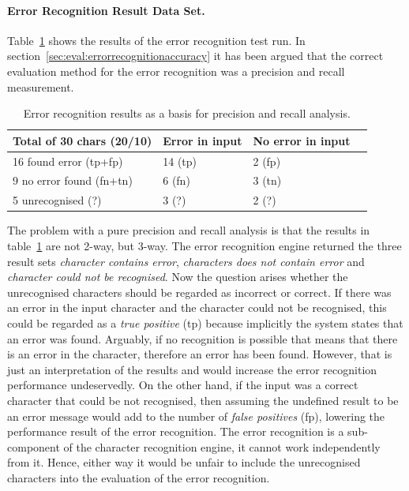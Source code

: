 \paragraph{Error Recognition Result Data Set.}
Table~\ref{table:eval:resultsprecisionandrecallnumbers} shows the results 
of the error recognition test run. 
In section~\ref{sec:eval:errorrecognitionaccuracy} it has been argued that the
correct evaluation method for the error recognition was a precision and recall
measurement.
\begin{table}[htbp]
\begin{center}
  \begin{tabular}{|l|l|l|p{200pt}|}
    \hline
    Total of 30 chars (20/10) & Error in input      & No error in input \\
    \hline
    16 found error (tp+fp)    & 14 (tp)             & 2 (fp) \\
    \hline
    9 no error found (fn+tn)  & 6 (fn)              & 3 (tn) \\
    \hline
    5 unrecognised (?)        & 3 (?)               & 2 (?) \\
    \hline
  \end{tabular}
\end{center}
\caption{Error recognition results as a basis for precision and recall analysis.}
\label{table:eval:resultsprecisionandrecallnumbers}
\end{table}
The problem with a pure precision and recall analysis is that the results
in table~\ref{table:eval:resultsprecisionandrecallnumbers} are not 2-way, 
but 3-way. The error recognition engine returned the three result sets 
\emph{character contains error}, \emph{characters does not contain error}
and \emph{character could not be recognised}.
Now the question arises whether the unrecognised characters should be 
regarded as incorrect or correct. 
If there was an error in the input character and the character could 
not be recognised, this could be regarded as a \emph{true positive} (tp)
because implicitly the system states that an error was found.
Arguably, if no recognition is possible that means that there is an 
error in the character, therefore an error has been found.
However, that is just an interpretation of the results and
would increase the error recognition performance undeservedly. 
On the other hand, if the input was a correct character that 
could be not recognised, then assuming the undefined result to be an error 
message would add to the number of \emph{false positives} (fp), 
lowering the performance result of the error recognition.
The error recognition is a sub-component of the character recognition engine,
it cannot work independently from it. 
Hence, either way it would be unfair to include the unrecognised
characters into the evaluation of the error recognition.

